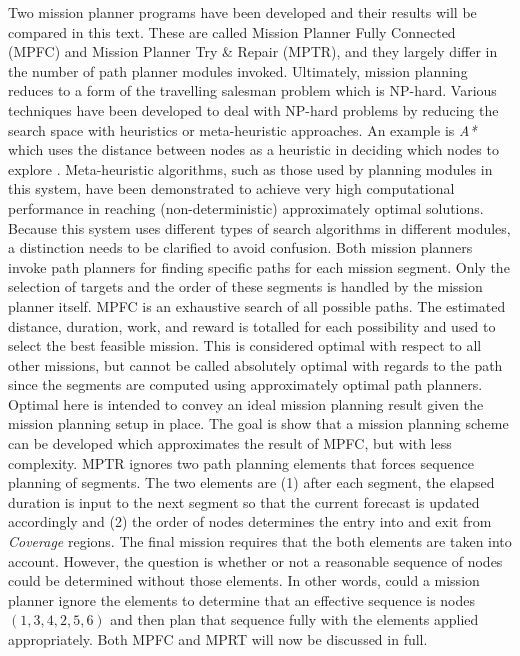 \documentclass{tamuccthesis}
\begin{document}
Two mission planner programs have been developed and their results will be compared in this text. These are called Mission Planner Fully Connected (MPFC) and Mission Planner Try \& Repair (MPTR), and they largely differ in the number of path planner modules invoked. Ultimately, mission planning reduces to a form of the travelling salesman problem which is NP-hard. Various techniques have been developed to deal with NP-hard problems by reducing the search space with heuristics or meta-heuristic approaches. An example is \textit{A*} which uses the distance between nodes as a heuristic in deciding which nodes to explore \cite{GURUJI:2016}. Meta-heuristic algorithms, such as those used by planning modules in this system, have been demonstrated to achieve very high computational performance in reaching (non-deterministic) approximately optimal solutions. Because this system uses different types of search algorithms in different modules, a distinction needs to be clarified to avoid confusion. Both mission planners invoke path planners for finding specific paths for each mission segment. Only the selection of targets and the order of these segments is handled by the mission planner itself. MPFC is an exhaustive search of all possible paths. The estimated distance, duration, work, and reward is totalled for each possibility and used to select the best feasible mission. This is considered optimal with respect to all other missions, but cannot be called absolutely optimal with regards to the path since the segments are computed using approximately optimal path planners. Optimal here is intended to convey an ideal mission planning result given the mission planning setup in place. The goal is show that a mission planning scheme can be developed which approximates the result of MPFC, but with less complexity. MPTR ignores two path planning elements that forces sequence planning of segments. The two elements are (1) after each segment, the elapsed duration is input to the next segment so that the current forecast is updated accordingly and (2) the order of nodes determines the entry into and exit from \textit{Coverage} regions. The final mission requires that the both elements are taken into account. However, the question is whether or not a reasonable sequence of nodes could be determined without those elements. In other words, could a mission planner ignore the elements to determine that an effective sequence is nodes $(1, 3, 4, 2, 5, 6)$ and then plan that sequence fully with the elements applied appropriately. Both MPFC and MPRT will now be discussed in full.
\end{document}
